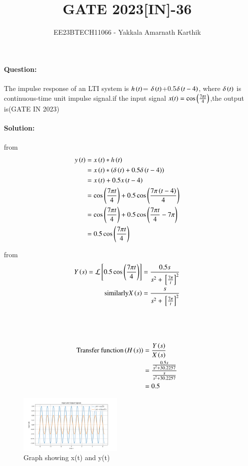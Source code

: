 \documentclass[journal,12pt,twocolumn]{IEEEtran}
\begin{document}


\title{GATE 2023[IN]-36}
\author{EE23BTECH11066 - Yakkala Amarnath Karthik}
\maketitle

\textbf{Question:}\\ \\
The impulse response of an LTI system is $h\left(t\right)$= $\delta\left(t\right)$+0.5$ \delta\left(t-4\right)$, where $\delta\left(t\right)$ is continuous-time unit impulse signal.if the input signal $x(t)=\cos\left(\frac{7\pi t}{4}\right)$,the output is\hfill(GATE IN 2023)\\ \\

\textbf{Solution:}\\
\\
 from 
\begin{align}
    y\left(t\right) &=x\left(t\right) * h\left(t\right)\\
            &=x\left(t\right) * \left(\delta\left(t\right)+0.5 \delta\left(t-4\right)\right)\\
            &=x\left(t\right)+0.5x\left(t-4\right)\\
            &=\cos\left(\frac{7\pi t}{4}\right)+0.5\cos\left(\frac{7\pi \left(t-4\right)}{4}\right)\\
            &=\cos\left(\frac{7\pi t}{4}\right)+0.5\cos\left(\frac{7\pi t}{4}-7\pi\right)\\
            &=0.5\cos\left(\frac{7\pi t}{4}\right)
\end{align}

from 
\begin{align}
    Y\left(s\right)=\mathcal{L}{}\left[0.5\cos{\ensuremath{\left(\frac{7\pi t}{4}\right)}}\right]=\frac{0.5s}{s^2+{}\left[\frac{7\pi}{t}\right]^2}\\
    \text{similarly} X\left(s\right)=\frac{s}{s^2+{}\left[\frac{7\pi}{t}\right]^2}
\end{align}
\\ \\ \\
\begin{align}
    \text{Transfer function}\left(H\left(s\right)\right)&=\frac{Y\left(s\right)}{X\left(s\right)}\\
    &=\frac{{\frac{0.5s}{s^2+30.2257}}}{{\frac{s}{s^2+30.2257}}}\\
    &=0.5
\end{align}
\bigskip
\bigskip
  \begin{figure}[ht]
        \hspace{1cm}\includegraphics[width=0.45\textwidth]{figs/pythongate.png}
        \caption{Graph showing x(t) and y(t)}
    \end{figure} 
\end{document}

